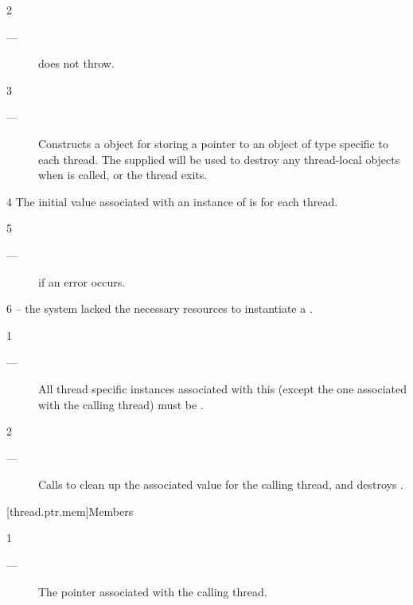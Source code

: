 \documentclass[fontsize=10pt,paper=A4,pagesize,DIV=15]{scrartcl}
\begin{document}
2 \precond
\begin{description}
    \item[---]  does not throw. 
\end{description}

3 \effects
\begin{description}
    \item[---] Constructs a \tptr object for storing a pointer to an object of
               type  specific to each thread. The supplied
                will be used to destroy any
               thread-local objects when  is called, or the
               thread exits.
\end{description}

4 \remarks
The initial value associated with an instance of \tptr is  for
each thread.

5 \except
\begin{description}
    \item[---]  if an error occurs.
\end{description}

6 \errors
{} -- the system lacked the necessary
resources to instantiate a \tptr.


1 \precond
\begin{description}
    \item[---] All thread specific instances associated with this \tptr
               (except the one associated with the calling thread) must be
               .
\end{description}

2 \effects
\begin{description}
    \item[---] Calls  to clean up the associated value for the
               calling thread, and destroys \this.
\end{description}


[thread.ptr.mem]{Members}


1 \returns
\begin{description}
    \item[---] The pointer associated with the calling thread.
\end{description}
\end{document}
